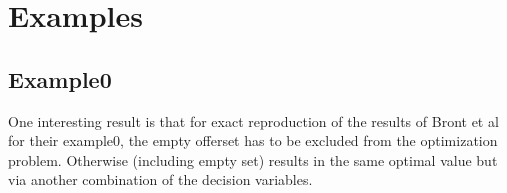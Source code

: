 \chapter{Examples}

\section{Example0}

One interesting result is that for exact reproduction of the results of Bront et al for their example0, the empty offerset has to be excluded from the optimization problem. Otherwise (including empty set) results in the same optimal value but via another combination of the decision variables.